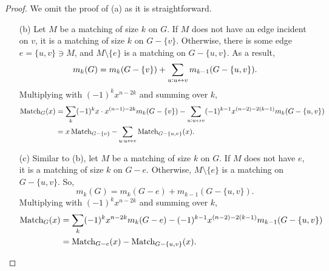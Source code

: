 	\begin{proof}
		We omit the proof of (a) as it is straightforward.
		\begin{itemize}
			\item[(b)] Let $M$ be a matching of size $k$ on $G$. If $M$ does not have an edge incident on $v$, it is a matching of size $k$ on $G - \{v\}$. Otherwise, there is some edge $e = \{u,v\} \ni M$, and $M \setminus \{e\}$ is a matching on $G - \{u,v\}$. As a result,
			\[ m_k(G) = m_k(G- \{v\}) + \sum_{u : u \leftrightarrow v} m_{k-1}(G-\{u,v\}). \]
			Multiplying with $(-1)^k x^{n-2k}$ and summing over $k$,
			\begin{align*}
				\operatorname{Match}_G(x) &= \sum_k (-1)^k x \cdot x^{(n-1)-2k} m_k(G - \{v\}) - \sum_{u : u \leftrightarrow v} (-1)^{k-1} x^{(n-2)-2(k-1)} m_k(G - \{u,v\}) \\
					&= x\operatorname{Match}_{G-\{v\}} - \sum_{u : u \leftrightarrow v} \operatorname{Match}_{G - \{u,v\}} (x).
			\end{align*}
			\item[(c)] Similar to (b), let $M$ be a matching of size $k$ on $G$. If $M$ does not have $e$, it is a matching of size $k$ on $G - e$. Otherwise, $M \setminus \{e\}$ is a matching on $G - \{u,v\}$. So,
			\[ m_k(G) = m_k(G - e) + m_{k-1}(G - \{u,v\}). \]
			Multiplying with $(-1)^k x^{n-2k}$ and summing over $k$,
			\begin{align*}
				\operatorname{Match}_G(x) &= \sum_k (-1)^k x^{n-2k} m_k(G-e) - (-1)^{k-1} x^{(n-2)-2(k-1)} m_{k-1}(G-\{u,v\}) \\
					&= \operatorname{Match}_{G-e}(x) - \operatorname{Match}_{G-\{u,v\}}(x). \qedhere
			\end{align*}
		\end{itemize}
	\end{proof}


